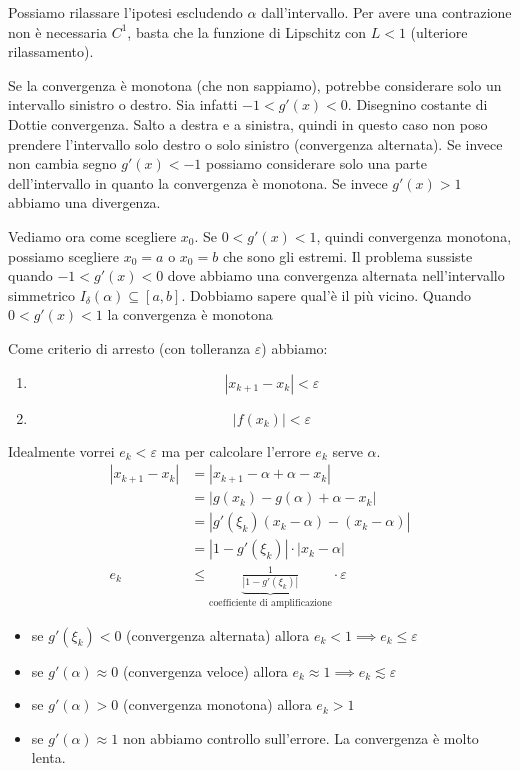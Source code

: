 \documentclass[a4paper]{article}
\begin{document}
Possiamo rilassare l'ipotesi escludendo \(\alpha\) dall'intervallo.
Per avere una contrazione non è necessaria \(C^1\), basta che la funzione di Lipschitz con \(L<1\)
(ulteriore rilassamento).

Se la convergenza è monotona (che non sappiamo), potrebbe considerare solo un intervallo
sinistro o destro. Sia infatti \(-1 < g'(x) < 0\).
Disegnino costante di Dottie convergenza. Salto a destra e a sinistra, quindi in questo caso
non poso prendere l'intervallo solo destro o solo sinistro (convergenza alternata).
Se invece non cambia segno \(g'(x) < -1\) possiamo considerare solo una parte dell'intervallo
in quanto la convergenza è monotona.
Se invece \(g'(x)>1\) abbiamo una divergenza.

Vediamo ora come scegliere \(x_0\). Se \(0 < g'(x) < 1\), quindi convergenza monotona,
possiamo scegliere \(x_0 = a\) o \(x_0 = b\) che sono gli estremi.
Il problema sussiste quando \(-1 < g'(x) < 0\) dove abbiamo una convergenza alternata
nell'intervallo simmetrico \(I_\delta(\alpha) \subseteq [a,b]\). Dobbiamo sapere qual'è il più vicino.
Quando \(0 < g'(x) < 1\) la convergenza è monotona 

Come criterio di arresto (con tolleranza \(\varepsilon\)) abbiamo:
\begin{enumerate}
    \item \[
        |x_{k+1} - x_k| < \varepsilon
    \]
    \item \[
        |f(x_k)| < \varepsilon
    \]
\end{enumerate}
Idealmente vorrei \(e_k < \varepsilon\) ma per calcolare l'errore \(e_k\)
serve \(\alpha\). 
\begin{align*}
    |x_{k+1} - x_k| &= |x_{k+1} - \alpha + \alpha - x_k| \\
    &= |g(x_k) - g(\alpha) + \alpha - x_k| \\
    &= |g'(\xi_k) (x_k-\alpha) - (x_k - \alpha)| \\
    &= |1 - g'(\xi_k)| \cdot |x_k - \alpha| \\
    e_k &\leq \underbrace{\frac{1}{|1-g'(\xi_k)|}}_{\text{coefficiente di amplificazione}} \cdot \varepsilon
\end{align*}

\begin{itemize}
    \item se \(g'(\xi_k) < 0\) (convergenza alternata) allora \(e_k < 1 \implies e_k \leq \varepsilon\)
    \item se \(g'(\alpha) \approx 0\) (convergenza veloce) allora \(e_k \approx 1 \implies e_k \lesssim \varepsilon\)
    \item se \(g'(\alpha) > 0\) (convergenza monotona) allora \(e_k > 1\)
    \item se \(g'(\alpha) \approx 1\) non abbiamo controllo sull'errore. La convergenza è molto lenta.
\end{itemize}
\end{document}
